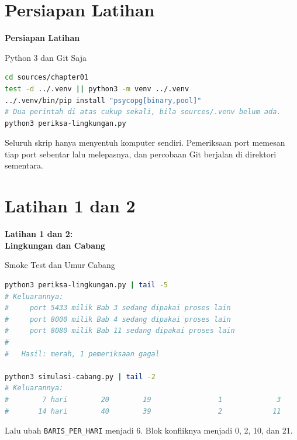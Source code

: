 \documentclass[aspectratio=169, table, 12pt]{beamer}
\begin{document}
\section{Persiapan Latihan}

\begin{frame}{\hfill}
  \centering
  \Huge{\textbf{Persiapan Latihan}}
\end{frame}

\begin{frame}[fragile]{{\Large Python 3 dan Git Saja}}
  \vspace{2pt}
\begin{lstlisting}[language=bash]
cd sources/chapter01
test -d ../.venv || python3 -m venv ../.venv
../.venv/bin/pip install "psycopg[binary,pool]"
# Dua perintah di atas cukup sekali, bila sources/.venv belum ada.
python3 periksa-lingkungan.py
\end{lstlisting}
  \vspace{2pt}
  {\small Seluruh skrip hanya menyentuh komputer sendiri. Pemeriksaan port
  memesan tiap port sebentar lalu melepasnya, dan percobaan Git berjalan di
  direktori sementara.}
\end{frame}

\section{Latihan 1 dan 2}

\begin{frame}{\hfill}
  \centering
  \Huge{\textbf{Latihan 1 dan 2:\\Lingkungan dan Cabang}}
\end{frame}

\begin{frame}[fragile]{{\Large Smoke Test dan Umur Cabang}}
  \vspace{2pt}
\begin{lstlisting}[language=bash]
python3 periksa-lingkungan.py | tail -5
# Keluarannya:
#     port 5433 milik Bab 3 sedang dipakai proses lain
#     port 8000 milik Bab 4 sedang dipakai proses lain
#     port 8080 milik Bab 11 sedang dipakai proses lain
#
#   Hasil: merah, 1 pemeriksaan gagal

python3 simulasi-cabang.py | tail -2
# Keluarannya:
#        7 hari        20        19                1             3
#       14 hari        40        39                2            11
\end{lstlisting}
  \vspace{2pt}
  {\small Lalu ubah \texttt{BARIS\_PER\_HARI} menjadi 6. Blok konfliknya
  menjadi 0, 2, 10, dan 21.}
\end{frame}
\end{document}
